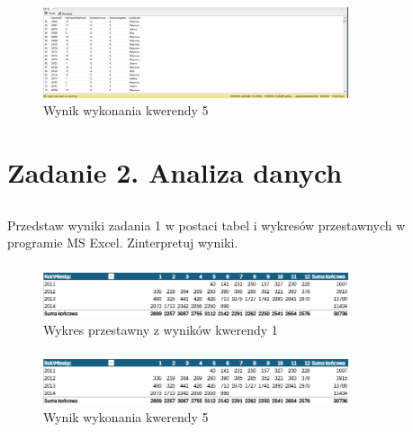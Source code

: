 \documentclass[a4paper,12pt]{article}
\begin{document}
\begin{figure}[H]
    \centering
    \includegraphics[width=0.8\textwidth]{images/05.png}
    \caption{Wynik wykonania kwerendy 5}
\end{figure}

\section{Zadanie 2. Analiza danych}

\subsection{}

Przedstaw wyniki zadania 1 w postaci tabel i wykresów przestawnych w programie MS Excel. Zinterpretuj wyniki.

\subsubsection{}

\begin{figure}[H]
    \centering
    \includegraphics[width=0.8\textwidth]{images/excel/01.png}
    \caption{Wykres przestawny z wyników kwerendy 1}
\end{figure}

\subsubsection{}

\begin{figure}[H]
    \centering
    \includegraphics[width=0.8\textwidth]{images/excel/01.png}
    \caption{Wynik wykonania kwerendy 5}
\end{figure}
\end{document}
